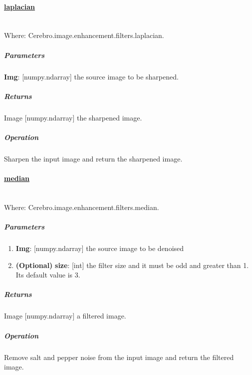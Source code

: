 \paragraph{\underline{laplacian}} \mbox{} \\
Where: Cerebro.image.enhancement.filters.laplacian.
\subparagraph{Parameters}
\begin{changemargin}{1cm}{0cm}
	\textbf{Img}: [numpy.ndarray] the source image to be sharpened.
\end{changemargin}

\subparagraph{Returns}
\begin{changemargin}{1cm}{0cm}
	Image [numpy.ndarray] the sharpened image.
\end{changemargin}

\subparagraph{Operation}
\begin{changemargin}{1cm}{0cm}
	Sharpen the input image and return the sharpened image.
\end{changemargin}

\hrulefill

\paragraph{\underline{median}} \mbox{} \\
Where: Cerebro.image.enhancement.filters.median.
\subparagraph{Parameters}
\begin{changemargin}{0.5cm}{0cm}
	\begin{enumerate}
		\item \textbf{Img}: [numpy.ndarray] the source image to be denoised
		\item \textbf{(Optional)} \textbf{size}: [int] the filter size and it must be odd and greater than 1. Its default value is 3.
	\end{enumerate}
\end{changemargin}

\subparagraph{Returns}
\begin{changemargin}{1cm}{0cm}
	Image [numpy.ndarray] a filtered image.
\end{changemargin}

\subparagraph{Operation}
\begin{changemargin}{1cm}{0cm}
 	Remove salt and pepper noise from the input image and return the filtered image.
\end{changemargin}

 	
